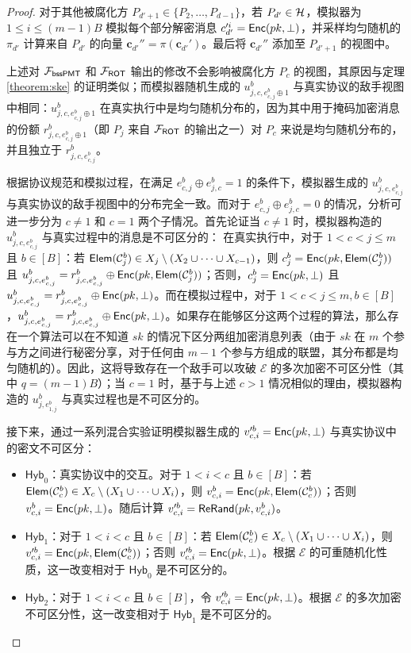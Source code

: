 \begin{proof}
对于其他被腐化方 $P_{d'+1} \in \{P_2, \dots, P_{d-1}\}$，若 $P_{d'} \in \mathcal{H}$，模拟器为 $1 \le i \le (m-1)B$ 模拟每个部分解密消息 ${c}_{d'}'^i = \mathsf{Enc}(pk, \perp)$，并采样均匀随机的 $\pi_{d'}$ 计算来自 $P_{d'}$ 的向量 $\textbf{c}_{d'}'' = {\pi}(\textbf{c}_{d'}')$。最后将 $\textbf{c}_{d'}''$ 添加至 $P_{d'+1}$ 的视图中。

上述对 $\mathcal{F}_\mathsf{bssPMT}$ 和 $\mathcal{F}_\mathsf{ROT}$ 输出的修改不会影响被腐化方 $P_c$ 的视图，其原因与定理 \ref{theorem:ske} 的证明类似；而模拟器随机生成的 $u_{j,c,e_{c,j}^b \oplus 1}^b$ 与真实协议的敌手视图中相同：$u_{j,c,e_{c,j}^b \oplus 1}^b$ 在真实执行中是均匀随机分布的，因为其中用于掩码加密消息的份额 $r_{j,c,e_{c,j}^b \oplus 1}^b$（即 $P_j$ 来自 $\mathcal{F}_\mathsf{ROT}$ 的输出之一）对 $P_c$ 来说是均匀随机分布的，并且独立于 $r_{j,c,e_{c,j}^b}^b$。

根据协议规范和模拟过程，在满足 $e_{c,j}^b \oplus e_{j,c}^b = 1$ 的条件下，模拟器生成的 $u_{j,c,e_{c,j}^b}^b$ 与真实协议的敌手视图中的分布完全一致。而对于 $e_{c,j}^b \oplus e_{j,c}^b = 0$ 的情况，分析可进一步分为 $c \ne 1$ 和 $c = 1$ 两个子情况。首先论证当 $c \ne 1$ 时，模拟器构造的 $u_{j,c,e_{c,j}^b}^b$ 与真实过程中的消息是不可区分的：
在真实执行中，对于 $1 < c < j \le m$ 且 $b \in [B]$：若 $\mathsf{Elem}(\mathcal{C}_j^b) \in X_j \setminus (X_2 \cup \dots \cup X_{c-1})$，则 $c_j^b = \mathsf{Enc}(pk, \mathsf{Elem}(\mathcal{C}_j^b))$ 且 $u_{j,c,e_{c,j}^b}^b = r_{j,c,e_{c,j}^b}^b \oplus \mathsf{Enc}(pk, \mathsf{Elem}(\mathcal{C}_j^b))$；否则，$c_j^b = \mathsf{Enc}(pk, \perp)$ 且 $u_{j,c,e_{c,j}^b}^b = r_{j,c,e_{c,j}^b}^b \oplus \mathsf{Enc}(pk, \perp)$。而在模拟过程中，对于 $1 < c < j \le m, b \in [B]$，$u_{j,c,e_{c,j}^b}^b = r_{j,c,e_{c,j}^b}^b \oplus \mathsf{Enc}(pk, \perp)$。如果存在能够区分这两个过程的算法，那么存在一个算法可以在不知道 $sk$ 的情况下区分两组加密消息列表（由于 $sk$ 在 $m$ 个参与方之间进行秘密分享，对于任何由 $m-1$ 个参与方组成的联盟，其分布都是均匀随机的）。因此，这将导致存在一个敌手可以攻破 $\mathcal{E}$ 的多次加密不可区分性（其中 $q = (m-1)B$）；当 $c = 1$ 时，基于与上述 $c > 1$ 情况相似的理由，模拟器构造的 $u_{j,e_{1,j}^b}^b$ 与真实过程也是不可区分的。

接下来，通过一系列混合实验证明模拟器生成的 ${v}_{c,i}'^b = \mathsf{Enc}(pk, \perp)$ 与真实协议中的密文不可区分：
\begin{itemize}
    \item $\mathsf{Hyb}_{0}$：真实协议中的交互。对于 $1 < i < c$ 且 $b \in [B]$：若 $\mathsf{Elem}(\mathcal{C}_c^b) \in X_c \setminus (X_1 \cup \dots \cup X_i)$，则 ${v}_{c,i}^b = \mathsf{Enc}(pk, \mathsf{Elem}(\mathcal{C}_c^b))$；否则 ${v}_{c,i}^b = \mathsf{Enc}(pk, \perp)$。随后计算 ${v}_{c,i}'^b = \mathsf{ReRand}(pk, {v}_{c,i}^b)$。
    \item $\mathsf{Hyb}_{1}$：对于 $1 < i < c$ 且 $b \in [B]$：若 $\mathsf{Elem}(\mathcal{C}_c^b) \in X_c \setminus (X_1 \cup \dots \cup X_i)$，则 ${v}_{c,i}'^b = \mathsf{Enc}(pk, \mathsf{Elem}(\mathcal{C}_c^b))$；否则 ${v}_{c,i}'^b = \mathsf{Enc}(pk, \perp)$。根据 $\mathcal{E}$ 的可重随机化性质，这一改变相对于 $\mathsf{Hyb}_{0}$ 是不可区分的。
    \item $\mathsf{Hyb}_{2}$：对于 $1 < i < c$ 且 $b \in [B]$，令 ${v}_{c,i}'^b = \mathsf{Enc}(pk, \perp)$。根据 $\mathcal{E}$ 的多次加密不可区分性，这一改变相对于 $\mathsf{Hyb}_{1}$ 是不可区分的。
\end{itemize}


\end{proof}
